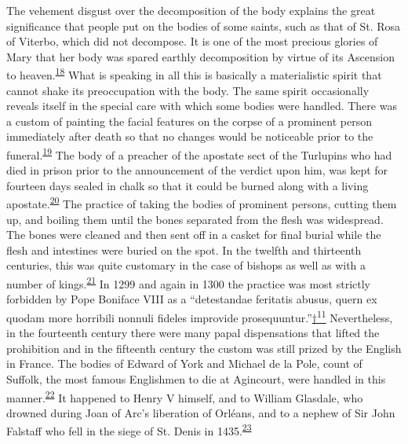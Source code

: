 The vehement disgust over the decomposition of the body explains the
great significance that people put on the bodies of some saints, such as
that of St. Rosa of Viterbo, which did not decompose. It is one of the
most precious glories of Mary that her body was spared earthly
decomposition by virtue of its Ascension to
heaven.\textsuperscript{\protect\hypertarget{12_Chapter_Five__THE_VISION_OF_DEAT.xhtmlux5cux23id_1316}{\protect\hyperlink{23_NOTES.xhtmlux5cux23id_1317}{18}}}
What is speaking in all this is basically a materialistic spirit that
cannot shake its preoccupation with the body. The same spirit
occasionally reveals itself in the special care with which some bodies
were handled. There was a custom of painting the facial features on the
corpse of a prominent person immediately after death so that no changes
would be noticeable prior to the
funeral.\textsuperscript{\protect\hypertarget{12_Chapter_Five__THE_VISION_OF_DEAT.xhtmlux5cux23id_1314}{\protect\hyperlink{23_NOTES.xhtmlux5cux23id_1315}{19}}}
The body of a preacher of the apostate sect of the Turlupins who had
died in prison prior to the announcement of the verdict upon him, was
kept for fourteen days sealed in chalk so that it could be burned along
with a living
apostate.\textsuperscript{\protect\hypertarget{12_Chapter_Five__THE_VISION_OF_DEAT.xhtmlux5cux23id_1312}{\protect\hyperlink{23_NOTES.xhtmlux5cux23id_1313}{20}}}
The practice of taking the bodies of prominent persons, cutting them up,
and boiling them until the bones separated from the flesh was
widespread. The bones were cleaned and then sent off in a casket for
final burial while the flesh and intestines were buried on the spot. In
the twelfth and thirteenth centuries, this was quite customary in the
case of bishops as well as with a number of
kings.\textsuperscript{\protect\hypertarget{12_Chapter_Five__THE_VISION_OF_DEAT.xhtmlux5cux23id_1310}{\protect\hyperlink{23_NOTES.xhtmlux5cux23id_1311}{21}}}
In 1299 and again in 1300 the practice was most strictly forbidden by
Pope Boniface VIII as a ``detestandae feritatis abusus, quern ex quodam
more horribili nonnuli fideles improvide
prosequuntur.''\protect\hypertarget{12_Chapter_Five__THE_VISION_OF_DEAT.xhtmlux5cux23id_2971}{\protect\hyperlink{23_NOTES.xhtmlux5cux23id_2972}{†\textsuperscript{11}}}
Nevertheless, in the
four\protect\hypertarget{12_Chapter_Five__THE_VISION_OF_DEAT.xhtmlux5cux23page_164}{}{}teenth
century there were many papal dispensations that lifted the prohibition
and in the fifteenth century the custom was still prized by the English
in France. The bodies of Edward of York and Michael de la Pole, count of
Suffolk, the most famous Englishmen to die at Agincourt, were handled in
this
manner.\textsuperscript{\protect\hypertarget{12_Chapter_Five__THE_VISION_OF_DEAT.xhtmlux5cux23id_1308}{\protect\hyperlink{23_NOTES.xhtmlux5cux23id_1309}{22}}}
It happened to Henry V himself, and to William Glasdale, who drowned
during Joan of Arc's liberation of Orléans, and to a nephew of Sir John
Falstaff who fell in the siege of St. Denis in
1435.\textsuperscript{\protect\hypertarget{12_Chapter_Five__THE_VISION_OF_DEAT.xhtmlux5cux23id_1306}{\protect\hyperlink{23_NOTES.xhtmlux5cux23id_1307}{23}}}

